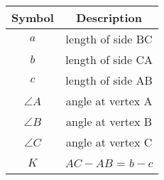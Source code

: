 \begin{tabular}[12pt]{ |c|c|}
    \hline
    \textbf{Symbol} & \textbf{Description} \\
    \hline
    \textbf{$a$} & length of side BC\\
    \hline
    \textbf{$b$} & length of side CA\\
    \hline
    \textbf{$c$} & length of side AB\\
    \hline
    $\angle A$ & angle at vertex A\\
    \hline
    $\angle B$ & angle at vertex B\\
    \hline
    $\angle C$ & angle at vertex C\\
    \hline
    \textbf{$K$} & $AC - AB$ = $b-c$\\
    \hline
    \end{tabular}
